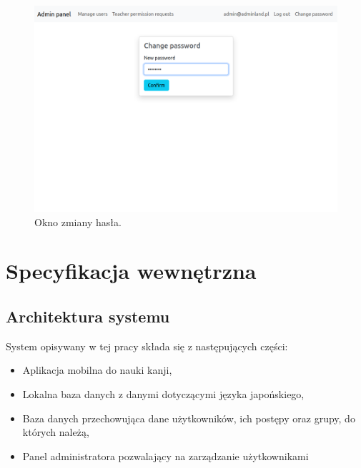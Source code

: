 \documentclass[a4paper,twoside,12pt]{book}
\begin{document}
\begin{figure}[]
\centering
\includegraphics[width=\textwidth]{adminpanel/changepwd}
\caption{Okno zmiany hasła.}
\label{fig:changepwd}
\end{figure}

\chapter{Specyfikacja wewnętrzna}
\label{ch:05}


\section{Architektura systemu}

System opisywany w tej pracy składa się z następujących części:
\begin{itemize}
\item Aplikacja mobilna do nauki kanji,
\item Lokalna baza danych z danymi dotyczącymi języka japońskiego,
\item Baza danych przechowująca dane użytkowników, ich postępy oraz grupy, do których należą,
\item Panel administratora pozwalający na zarządzanie użytkownikami
\end{itemize}
\end{document}
